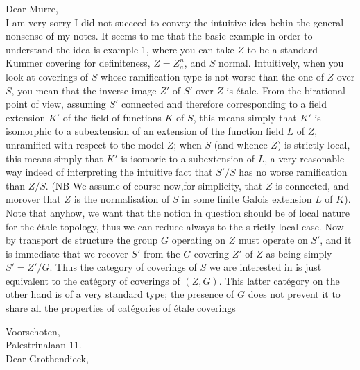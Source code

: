 
Dear Murre,\\

I am very sorry I did not succeed to convey the intuitive idea behin the general nonsense of my notes. It seems to me that the basic example in order to understand the idea is example 1, where you can take $Z$ to be a standard Kummer covering for definiteness, $Z=Z_a^n$, and $S$ normal. Intuitively, when you look at coverings  of $S$ whose ramification type is not worse than the one of $Z$ over $S$, you mean that the  inverse image $Z'$ of $S'$ over $Z$ is étale.  From the birational point of view, assuming $S'$ connected and therefore corresponding to a field extension $K'$ of the field of functions $K$ of $S$, this means simply that $K'$ is isomorphic to a subextension of an extension  of the function field $L$ of $Z$, unramified with respect to the model $Z$; when $S$ (and whence $Z$) is strictly local,  this means simply that $K'$ is isomoric to a subextension of $L$, a very reasonable way indeed of interpreting the intuitive fact that $S'/S$ has no worse ramification than $Z/S$. (NB We assume of course now,for simplicity, that $Z$ is connected, and morover that $Z$ is the normalisation of $S$ in some finite Galois extension $L$ of $K$). Note that anyhow, we want that the notion in question should be of local nature for the étale topology, thus we can reduce always to the s rictly local case. Now by transport de structure the group $G$ operating on $Z$ must operate on $S'$, and it is immediate that we recover $S'$ from the $G$-covering $Z'$ of $Z$ as being simply $S'=Z'/G$. Thus  the category of coverings of $S$ we are interested in is just equivalent to the catégory of  coverings of $(Z,G)$. This latter catégory on the other hand is of a very standard type; the presence of $G$ does not prevent it to share all the properties of catégories of étale coverings

Voorschoten, \\
Palestrinalaan 11.\\

Dear Grothendieck,\\

